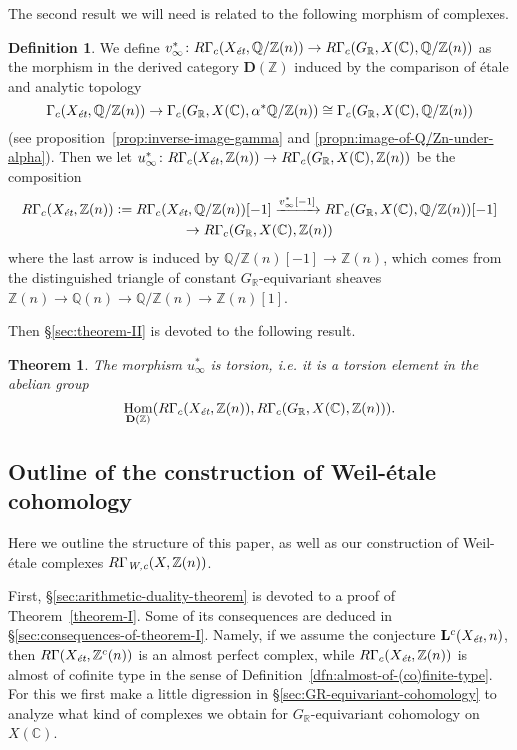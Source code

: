 \documentclass[leqno,12pt]{article}
\theoremstyle{plain}
\newtheorem{maintheorem}{Theorem}
\theoremstyle{definition}
\newtheorem{definition}[theorem]{\indent\sc Definition}
\DeclareMathOperator{\Hom}{Hom}
\newcommand{\ZZ}{\mathbb{Z}}
\newcommand{\QQ}{\mathbb{Q}}
\newcommand{\RR}{\mathbb{R}}
\newcommand{\CC}{\mathbb{C}}
\newcommand{\dfn}{\mathrel{\mathop:}=}
\newcommand{\Wc}{\text{\it W,c}}
\newcommand{\et}{\text{\it \'{e}t}}
\begin{document}
The second result we will need is related to the following morphism of
complexes.

\begin{definition}
  \label{dfn:u-infty}
  We define
  $v_\infty^*\colon R\Gamma_c (X_\et, \QQ/\ZZ (n)) \to R\Gamma_c (G_\RR, X (\CC), \QQ/\ZZ (n))$
  as the morphism in the derived category $\mathbf{D} (\ZZ)$ induced by the
  comparison of \'{e}tale and analytic topology
  \[ \Gamma_c (X_\et, \QQ/\ZZ (n)) \to
  \Gamma_c (G_\RR, X (\CC), \alpha^* \QQ/\ZZ (n)) \cong
  \Gamma_c (G_\RR, X (\CC), \QQ/\ZZ (n)) \]
  (see proposition~\ref{prop:inverse-image-gamma} and
  \ref{propn:image-of-Q/Zn-under-alpha}). Then we let
  $u_\infty^*\colon R\Gamma_c (X_\et, \ZZ(n)) \to R\Gamma_c (G_\RR, X (\CC), \ZZ (n))$
  be the composition
  \begin{multline*}
    R\Gamma_c (X_\et, \ZZ(n)) \dfn R\Gamma_c (X_\et, \QQ/\ZZ (n)) [-1]
    \xrightarrow{v_\infty^* [-1]} R\Gamma_c (G_\RR, X (\CC), \QQ/\ZZ (n)) [-1]
    \\ \to R\Gamma_c (G_\RR, X (\CC), \ZZ (n))
  \end{multline*}
  where the last arrow is induced by $\QQ/\ZZ (n) [-1] \to \ZZ (n)$, which comes
  from the distinguished triangle of constant $G_\RR$-equivariant sheaves
  $\ZZ (n) \to \QQ (n) \to \QQ/\ZZ (n) \to \ZZ (n) [1]$.
\end{definition}

Then \S\ref{sec:theorem-II} is devoted to the following result.

\begin{maintheorem}
  \label{theorem-II}
  The morphism $u_\infty^*$ is torsion, i.e. it is a torsion element in the
  abelian group
  $$\Hom_{\mathbf{D} (\ZZ)} (R\Gamma_c (X_\et, \ZZ(n)), R\Gamma_c (G_\RR, X (\CC), \ZZ(n))).$$
\end{maintheorem}

\subsection*{Outline of the construction of Weil-\'{e}tale cohomology}

Here we outline the structure of this paper, as well as our construction of
Weil-\'{e}tale complexes $R\Gamma_\Wc (X, \ZZ (n))$.

First, \S\ref{sec:arithmetic-duality-theorem} is devoted to a proof of
Theorem~\ref{theorem-I}. Some of its consequences are deduced in
\S\ref{sec:consequences-of-theorem-I}. Namely, if we assume the conjecture
$\mathbf{L}^c (X_\et, n)$, then $R\Gamma (X_\et, \ZZ^c (n))$ is an almost
perfect complex, while $R\Gamma_c (X_\et, \ZZ (n))$ is almost of cofinite type
in the sense of Definition~\ref{dfn:almost-of-(co)finite-type}. For this we
first make a little digression in \S\ref{sec:GR-equivariant-cohomology} to
analyze what kind of complexes we obtain for $G_\RR$-equivariant cohomology on
$X (\CC)$.
\end{document}
